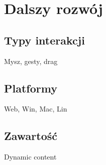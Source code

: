 \section{Dalszy rozwój}
\subsection{Typy interakcji}
Mysz, gesty, drag

\subsection{Platformy}
Web, Win, Mac, Lin 

\subsection{Zawartość}
Dynamic content
